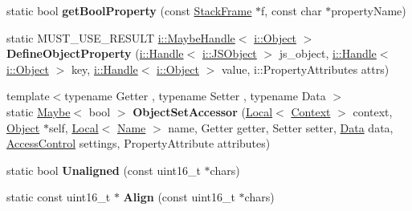\begin{DoxyCompactItemize}
\item 
static bool {\bfseries get\+Bool\+Property} (const \hyperlink{classv8_1_1_stack_frame}{Stack\+Frame} $\ast$f, const char $\ast$property\+Name)\hypertarget{namespacev8_a9feb35237599f6e6c8fc50288e8977d7}{}\label{namespacev8_a9feb35237599f6e6c8fc50288e8977d7}

\item 
static M\+U\+S\+T\+\_\+\+U\+S\+E\+\_\+\+R\+E\+S\+U\+LT \hyperlink{classv8_1_1internal_1_1_maybe_handle}{i\+::\+Maybe\+Handle}$<$ \hyperlink{classv8_1_1internal_1_1_object}{i\+::\+Object} $>$ {\bfseries Define\+Object\+Property} (\hyperlink{classv8_1_1internal_1_1_handle}{i\+::\+Handle}$<$ \hyperlink{classv8_1_1internal_1_1_j_s_object}{i\+::\+J\+S\+Object} $>$ js\+\_\+object, \hyperlink{classv8_1_1internal_1_1_handle}{i\+::\+Handle}$<$ \hyperlink{classv8_1_1internal_1_1_object}{i\+::\+Object} $>$ key, \hyperlink{classv8_1_1internal_1_1_handle}{i\+::\+Handle}$<$ \hyperlink{classv8_1_1internal_1_1_object}{i\+::\+Object} $>$ value, i\+::\+Property\+Attributes attrs)\hypertarget{namespacev8_a1d0b46e2c894d9aa860bd367af401ca8}{}\label{namespacev8_a1d0b46e2c894d9aa860bd367af401ca8}

\item 
{\footnotesize template$<$typename Getter , typename Setter , typename Data $>$ }\\static \hyperlink{classv8_1_1_maybe}{Maybe}$<$ bool $>$ {\bfseries Object\+Set\+Accessor} (\hyperlink{classv8_1_1_local}{Local}$<$ \hyperlink{classv8_1_1_context}{Context} $>$ context, \hyperlink{classv8_1_1_object}{Object} $\ast$self, \hyperlink{classv8_1_1_local}{Local}$<$ \hyperlink{classv8_1_1_name}{Name} $>$ name, Getter getter, Setter setter, \hyperlink{classv8_1_1_data}{Data} data, \hyperlink{namespacev8_a31d8355cb043d7d2dda3f4a52760b64e}{Access\+Control} settings, Property\+Attribute attributes)\hypertarget{namespacev8_ae1915feeabfddf2c4c1aa9084e5b78f7}{}\label{namespacev8_ae1915feeabfddf2c4c1aa9084e5b78f7}

\item 
static bool {\bfseries Unaligned} (const uint16\+\_\+t $\ast$chars)\hypertarget{namespacev8_ae973ee8cd1cda14c56899a99ca9ad830}{}\label{namespacev8_ae973ee8cd1cda14c56899a99ca9ad830}

\item 
static const uint16\+\_\+t $\ast$ {\bfseries Align} (const uint16\+\_\+t $\ast$chars)\hypertarget{namespacev8_a9e70806f03c9f2470a251443d20f4929}{}\label{namespacev8_a9e70806f03c9f2470a251443d20f4929}


\end{DoxyCompactItemize}

